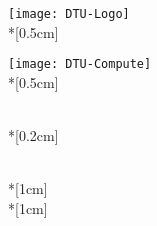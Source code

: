 \begin{titlepage}
\begin{adjustwidth}{-0.5cm}{-0.5cm}
    \sffamily
    \begin{flushright}
        \texttt{[image: DTU-Logo]}\\*[0.5cm]
        \large
        \subjectid\\
        \large
        \subject\\
    \end{flushright}
    \vspace*{\fill}
    \noindent
    \texttt{[image: DTU-Compute]}\\*[0.5cm]
        {\raggedright%
            \Huge 
            \projecttitle\\*[0.2cm]
        }
        \Large 
        \noindent\projectsubtitle\\*[1cm]
        \large
        \projectauthor\\*[1cm]
        \projectdate
\end{adjustwidth}
\end{titlepage}